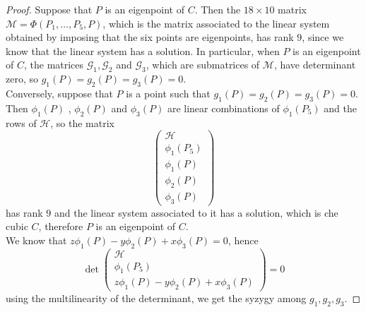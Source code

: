 \documentclass[10pt, a4paper, reqno, captions=tableheading,bibliography=totoc]{scrartcl}
\theoremstyle{plain}
\theoremstyle{definition}
\begin{document}
\begin{proof}
  Suppose that $P$ is an eigenpoint of $C$. Then the $18\times 10$ matrix
  $\mathcal{M} = \Phi(P_1, \dots, P_5, P)$, which is the matrix
  associated to the linear
  system obtained by imposing that the six points are eigenpoints, 
  has rank $9$, since we know that the linear system has a solution.
  In particular, when $P$ is an eigenpoint of $C$, the matrices
  $\mathcal{G}_1, \mathcal{G}_2$ and $\mathcal{G}_3$, which are
  submatrices of $\mathcal{M}$, have determinant zero, so
  $g_1(P) = g_2(P) = g_3(P) = 0$. \\
  Conversely, suppose that $P$ is a point such that
  $g_1(P) = g_2(P) = g_3(P) = 0$. Then $\phi_1(P)$ , $\phi_2(P)$ and
  $\phi_3(P)$ are linear combinations of $\phi_1(P_5)$ and the rows
  of $\mathcal{H}$, so the matrix
  \[
\left(
\begin{array}{c}
  \mathcal{H} \\
  \phi_1(P_5)\\
  \phi_1(P)\\
  \phi_2(P)\\
  \phi_3(P)
\end{array}
\right)
\]
has rank $9$ and the linear system associated to it has a solution,
which is che cubic $C$, therefore $P$ is an eigenpoint of $C$. \\
We know that $z \phi_1(P)-y\phi_2(P) +x\phi_3(P) = 0$, hence
\[
\det
\left(
\begin{array}{c}
  \mathcal{H} \\
  \phi_1(P_5)\\
  z \phi_1(P)-y\phi_2(P) +x\phi_3(P)
\end{array}
\right) = 0
\]
using the multilinearity of the determinant, we get the syzygy among
$g_1, g_2, g_3$.
\end{proof}
\end{document}
